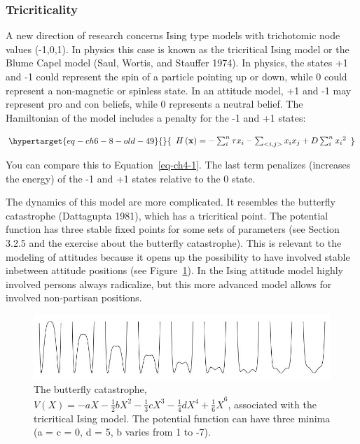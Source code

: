 \documentclass[
  letterpaper,
]{scrbook}
\begin{document}
\hypertarget{tricriticality}{%
\subsubsection{Tricriticality}\label{tricriticality}}

A new direction of research concerns Ising type models with trichotomic
node values (-1,0,1). In physics this case is known as the tricritical
Ising model or the Blume Capel model (Saul, Wortis, and Stauffer 1974).
In physics, the states +1 and -1 could represent the spin of a particle
pointing up or down, while 0 could represent a non-magnetic or spinless
state. In an attitude model, +1 and -1 may represent pro and con
beliefs, while 0 represents a neutral belief. The Hamiltonian of the
model includes a penalty for the -1 and +1 states:

\begin{equation}\protect\hypertarget{eq-ch6-8-old-49}{}{\begin{array}{r}
H\left( \mathbf{x} \right) = - \sum_{i}^{n}{\tau x_{i}} - \sum_{< i,j >}^{}{x_{i}x_{j}} + D\sum_{i}^{n}{x_{i}}^{2}
\end{array}}\label{eq-ch6-8-old-49}\end{equation}

You can compare this to Equation~\ref{eq-ch4-1}. The last term penalizes
(increases the energy) of the -1 and +1 states relative to the 0 state.

The dynamics of this model are more complicated. It resembles the
butterfly catastrophe (Dattagupta 1981), which has a tricritical point.
The potential function has three stable fixed points for some sets of
parameters (see Section 3.2.5 and the exercise about the butterfly
catastrophe). This is relevant to the modeling of attitudes because it
opens up the possibility to have involved stable inbetween attitude
positions (see Figure~\ref{fig-ch6-img15-old-84}). In the Ising attitude
model highly involved persons always radicalize, but this more advanced
model allows for involved non-partisan positions.

\begin{figure}

{\centering \includegraphics[width=5.48611in,height=\textheight]{media/ch6/image15.jpg}

}

\caption{\label{fig-ch6-img15-old-84}The butterfly catastrophe,
\(V(X) = {- aX - \frac{1}{2}bX^{2} - \frac{1}{3}cX^{3} - \frac{1}{4}dX^{4} + \frac{1}{6}X}^{6}\),
associated with the tricritical Ising model. The potential function can
have three minima (a = c = 0, d = 5, b varies from 1 to -7).}

\end{figure}
\end{document}
